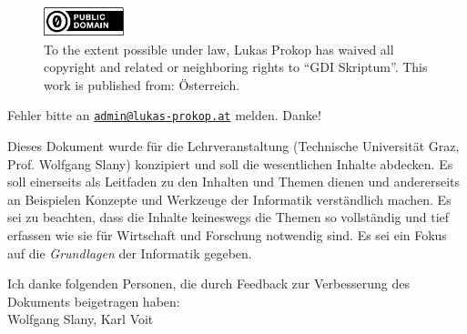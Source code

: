 \begin{titlepage}
  \begin{center}
    \begin{figure}[ht!]
      \begin{center}
        \includegraphics[width=88px,height=33px]{img/cc0.pdf} \\[20pt]%
        To the extent possible under law, Lukas Prokop has waived all copyright and related
        or neighboring rights to ``GDI Skriptum''. This work is published from: Österreich. 
      \end{center}
    \end{figure}
    \vspace{50pt}
    \noindent Fehler bitte an
    \href{mailto:admin@lukas-prokop.at}{\nolinkurl{admin@lukas-prokop.at}}
    melden. Danke!
    \vspace{50pt}

    Dieses Dokument wurde für die Lehrveranstaltung \courselfocs{}
    (Technische Universität Graz, Prof. Wolfgang Slany) konzipiert
    und soll die wesentlichen Inhalte abdecken. Es soll einerseits als
    Leitfaden zu den Inhalten und Themen dienen und andererseits an Beispielen
    Konzepte und Werkzeuge der Informatik verständlich machen. Es sei zu beachten,
    dass die Inhalte keineswegs die Themen so vollständig und tief erfassen
    wie sie für Wirtschaft und Forschung notwendig sind. Es sei ein Fokus
    auf die \emph{Grundlagen} der Informatik gegeben.

    \vspace{50pt}
    Ich danke folgenden Personen, die durch Feedback zur Verbesserung
    des Dokuments beigetragen haben: \\[15pt]
    Wolfgang Slany, Karl Voit
  \end{center}
\end{titlepage}

